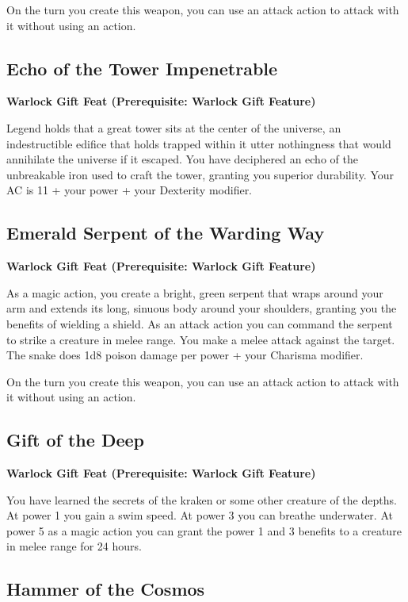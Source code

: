\documentclass[12pt,letterpaper,twocolumn,openany,nodeprecatedcode,bg=none]{dndbook}
\begin{document}
On the turn you create this weapon, you can use an attack action to
attack with it without using an action.

\subsection{Echo of the Tower
Impenetrable}\label{echo-of-the-tower-impenetrable}

\textbf{Warlock Gift Feat (Prerequisite: Warlock Gift Feature)}

Legend holds that a great tower sits at the center of the universe, an
indestructible edifice that holds trapped within it utter nothingness
that would annihilate the universe if it escaped. You have deciphered an
echo of the unbreakable iron used to craft the tower, granting you
superior durability. Your AC is 11 + your power + your Dexterity
modifier.

\subsection{Emerald Serpent of the Warding
Way}\label{emerald-serpent-of-the-warding-way}

\textbf{Warlock Gift Feat (Prerequisite: Warlock Gift Feature)}

As a magic action, you create a bright, green serpent that wraps around
your arm and extends its long, sinuous body around your shoulders,
granting you the benefits of wielding a shield. As an attack action you
can command the serpent to strike a creature in melee range. You make a
melee attack against the target. The snake does 1d8 poison damage per
power + your Charisma modifier.

On the turn you create this weapon, you can use an attack action to
attack with it without using an action.

\subsection{Gift of the Deep}\label{gift-of-the-deep}

\textbf{Warlock Gift Feat (Prerequisite: Warlock Gift Feature)}

You have learned the secrets of the kraken or some other creature of the
depths. At power 1 you gain a swim speed. At power 3 you can breathe
underwater. At power 5 as a magic action you can grant the power 1 and 3
benefits to a creature in melee range for 24 hours.

\subsection{Hammer of the Cosmos}\label{hammer-of-the-cosmos}
\end{document}
